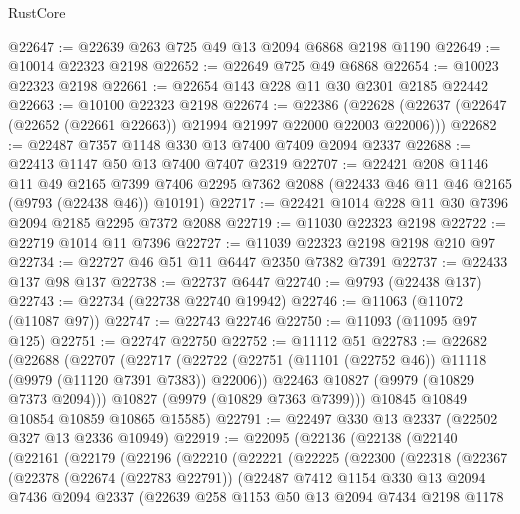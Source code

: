 \begin{lexlean}{RustCore}
\begin{coremodule}
@22647 := @22639 @263 @725 @49 @13 @2094 @6868 @2198 @1190
@22649 := @10014 @22323 @2198
@22652 := @22649 @725 @49 @6868
@22654 := @10023 @22323 @2198
@22661 := @22654 @143 @228 @11 @30 @2301 @2185 @22442
@22663 := @10100 @22323 @2198
@22674 := @22386
    (@22628 (@22637 (@22647 (@22652 (@22661 @22663)) @21994 @21997 @22000 @22003 @22006)))
@22682 := @22487 @7357 @1148 @330 @13 @7400 @7409 @2094 @2337
@22688 := @22413 @1147 @50 @13 @7400 @7407 @2319
@22707 := @22421
    @208
    @1146
    @11
    @49
    @2165
    @7399
    @7406
    @2295
    @7362
    @2088
    (@22433 @46 @11 @46 @2165 (@9793 (@22438 @46)) @10191)
@22717 := @22421 @1014 @228 @11 @30 @7396 @2094 @2185 @2295 @7372 @2088
@22719 := @11030 @22323 @2198
@22722 := @22719 @1014 @11 @7396
@22727 := @11039 @22323 @2198 @2198 @210 @97
@22734 := @22727 @46 @51 @11 @6447 @2350 @7382 @7391
@22737 := @22433 @137 @98 @137
@22738 := @22737 @6447
@22740 := @9793 (@22438 @137)
@22743 := @22734 (@22738 @22740 @19942)
@22746 := @11063 (@11072 (@11087 @97))
@22747 := @22743 @22746
@22750 := @11093 (@11095 @97 @125)
@22751 := @22747 @22750
@22752 := @11112 @51
@22783 := @22682
    (@22688
      (@22707
        (@22717
          (@22722 (@22751 (@11101 (@22752 @46)) @11118 (@9979 (@11120 @7391 @7383)) @22006))
          @22463
          @10827
          (@9979 (@10829 @7373 @2094)))
        @10827
        (@9979 (@10829 @7363 @7399)))
      @10845
      @10849
      @10854
      @10859
      @10865
      @15585)
@22791 := @22497 @330 @13 @2337 (@22502 @327 @13 @2336 @10949)
@22919 := @22095
    (@22136
      (@22138
        (@22140
          (@22161
            (@22179
              (@22196
                (@22210
                  (@22221
                    (@22225
                      (@22300
                        (@22318
                          (@22367
                            (@22378
                              (@22674 (@22783 @22791))
                              (@22487
                                @7412
                                @1154
                                @330
                                @13
                                @2094
                                @7436
                                @2094
                                @2337
                                (@22639
                                  @258
                                  @1153
                                  @50
                                  @13
                                  @2094
                                  @7434
                                  @2198
                                  @1178

\end{coremodule}
\end{lexlean}
